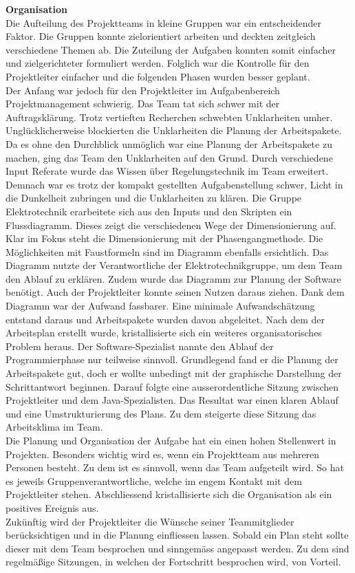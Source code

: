 \textbf{Organisation}\\
Die Aufteilung des Projektteams in kleine Gruppen war ein entscheidender Faktor. Die Gruppen konnte zielorientiert arbeiten und deckten zeitgleich verschiedene Themen ab. Die Zuteilung der Aufgaben konnten somit einfacher und zielgerichteter formuliert werden. Folglich war die Kontrolle für den Projektleiter einfacher und die folgenden Phasen wurden besser geplant.\\ 
Der Anfang war jedoch für den Projektleiter im Aufgabenbereich Projektmanagement schwierig. Das Team tat sich schwer mit der Auftragsklärung. Trotz vertieften Recherchen schwebten Unklarheiten umher. Unglücklicherweise blockierten die Unklarheiten die Planung der Arbeitspakete. Da es ohne den Durchblick unmöglich war eine Planung der Arbeitspakete zu machen, ging das Team den Unklarheiten auf den Grund. Durch verschiedene Input Referate wurde das Wissen über Regelungstechnik im Team erweitert. Demnach war es trotz der kompakt gestellten Aufgabenstellung schwer, Licht in die Dunkelheit zubringen und die Unklarheiten zu klären. Die Gruppe Elektrotechnik erarbeitete sich aus den Inputs und den Skripten ein Flussdiagramm. Dieses zeigt die verschiedenen Wege der Dimensionierung auf. Klar im Fokus steht die Dimensionierung mit der Phasengangmethode. Die Möglichkeiten mit Faustformeln sind im Diagramm ebenfalls ersichtlich. Das Diagramm nutzte der Verantwortliche der Elektrotechnikgruppe, um dem Team den Ablauf zu erklären. Zudem wurde das Diagramm zur Planung der Software benötigt. Auch der Projektleiter konnte seinen Nutzen daraus ziehen. Dank dem Diagramm war der Aufwand fassbarer. Eine minimale Aufwandschätzung entstand daraus und Arbeitspakete wurden davon abgeleitet. Nach dem der Arbeitsplan erstellt wurde, kristallisierte sich ein weiteres organisatorisches Problem heraus. Der Software-Spezialist nannte den Ablauf der Programmierphase nur teilweise sinnvoll. Grundlegend fand er die Planung der Arbeitspakete gut, doch er wollte unbedingt mit der graphische Darstellung der Schrittantwort beginnen. Darauf folgte eine ausserordentliche Sitzung zwischen Projektleiter und dem Java-Spezialisten. Das Resultat war einen klaren Ablauf und eine Umstrukturierung des Plans. Zu dem steigerte diese Sitzung das Arbeitsklima im Team.\\ 
Die Planung und Organisation der Aufgabe hat ein einen hohen Stellenwert in Projekten. Besonders wichtig wird es, wenn ein Projektteam aus mehreren Personen besteht. Zu dem ist es sinnvoll, wenn das Team aufgeteilt wird. So hat es jeweils Gruppenverantwortliche, welche im engem Kontakt mit dem Projektleiter stehen. Abschliessend kristallisierte sich die Organisation als ein positives Ereignis aus.\\ 
Zukünftig wird der Projektleiter die Wünsche seiner Teammitglieder berücksichtigen und in die Planung einfliessen lassen. Sobald ein Plan steht sollte dieser mit dem Team besprochen und sinngemäss angepasst werden. Zu dem sind regelmäßige Sitzungen, in welchen der Fortschritt besprochen wird, von Vorteil.\\

